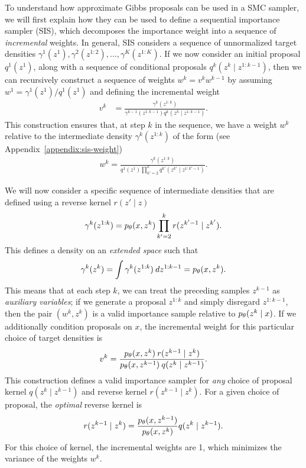 \documentclass{article}
\theoremstyle{definition}
\begin{document}
To understand how approximate Gibbs proposals can be used in a SMC sampler, we will first explain how they can be used to define a sequential importance sampler (SIS), which decomposes the importance weight into a sequence of \emph{incremental} weights. In general, SIS considers a sequence of unnormalized target densities $\gamma^1(z^1), \gamma^2(z^{1:2}), \dots, \gamma^K(z^{1:K})$. If we now consider an initial proposal $q^1(z^1)$, along with a sequence of conditional proposals $q^k(z^k \mid z^{1:k-1})$, then we can recursively construct a sequence of weights $w^k = v^k w^{k-1}$ by assuming $w^1 = \gamma^1(z^1) / q^1(z^1)$ and defining the incremental weight
\begin{align*}
    v^k 
    &=
    \frac{\gamma^k(z^{1:k})}{\gamma^{k-1}(z^{1:k-1}) q^k(z^k \mid z^{1:k-1})}.
\end{align*}
This construction ensures that, at step $k$ in the sequence, we have a weight $w^k$ relative to the intermediate  density $\gamma^k(z^{1:k})$ of the form (see Appendix~\ref{appendix:sis-weight})
\begin{align*}
    w^k
    = 
    \frac{\gamma^k(z^{1:k})}
         {q^1(z^1) \prod_{k'=2}^k q^{k'}(z^{k'} \mid z^{1:k'-1})}.
\end{align*}

We will now consider a specific sequence of intermediate densities that are defined using a reverse kernel $r(z' \mid z)$
\begin{align*}
    \gamma^k(z^{1:k})
    =
    p_\theta(x,z^k) \prod_{k'=2}^{k} r(z^{k'-1} \mid z^{k'})
    .
\end{align*}
This defines a density on an \emph{extended space} such that 
\begin{align*}
    \gamma^k(z^k) = \int \gamma^k(z^{1:k}) \: dz^{1:k-1} = p_\theta(x, z^k).
\end{align*}
This means that at each step $k$, we can treat the preceding samples $z^{k-1}$ as \emph{auxiliary variables}; if we generate a proposal $z^{1:k}$ and simply disregard $z^{1:k-1}$, then the pair $(w^k, z^k)$ is a valid importance sample relative to $p_\theta(z^k \mid x)$. If we additionally condition proposals on $x$, the incremental weight for this particular choice of target densities is
\begin{align}
    \label{eq:incremental-weight-forward-reverse}
    v^k 
    = 
    \frac{p_\theta(x,z^k) \: r(z^{k-1} \mid  z^k)}
         {p_\theta(x,z^{k-1}) \: q(z^{k} \mid  z^{k-1})}
    .
\end{align}
This construction defines a valid importance sampler for \emph{any} choice of proposal kernel $q(z^k \mid z^{k-1})$ and reverse kernel $r(z^{k-1} \mid z^{k})$. For a given choice of proposal, the \emph{optimal} reverse kernel is
\begin{align*}
    r(z^{k-1} \mid  z^k)
    =   
    \frac{p_\theta(x,z^{k-1})}
         {p_\theta(x,z^k)}
    q(z^{k} \mid  z^{k-1})
    .
\end{align*}
For this choice of kernel, the incremental weights are 1, which minimizes the variance of the weights $w^k$.
\end{document}
